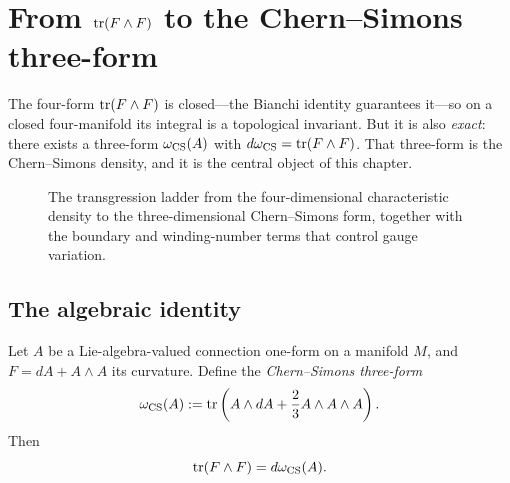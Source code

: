 \section{From $\operatorname{tr}(F\wedge F)$ to the Chern--Simons three-form}\label{sec:CS-form}

The four-form $\operatorname{tr}(F\wedge F)$ is closed---the Bianchi identity guarantees it---so on a closed four-manifold its integral is a topological invariant.  But it is also \emph{exact}: there exists a three-form $\omega_{\operatorname{CS}}(A)$ with $d\omega_{\operatorname{CS}} = \operatorname{tr}(F\wedge F)$.  That three-form is the Chern--Simons density, and it is the central object of this chapter.

\begin{figure}[h]
    \centering
    
    \caption{The transgression ladder from the four-dimensional characteristic density to the three-dimensional Chern--Simons form, together with the boundary and winding-number terms that control gauge variation.}
    \label{fig:transgression-ladder}
\end{figure}

\subsection{The algebraic identity}

\begin{proposition}\label{prop:CS-form}
Let $A$ be a Lie-algebra-valued connection one-form on a manifold $M$, and $F = dA + A\wedge A$ its curvature. Define the \emph{Chern--Simons three-form}
\begin{equation}\label{eq:CS-form-def}
\omega_{\operatorname{CS}}(A) := \operatorname{tr}\left(A\wedge dA + \frac{2}{3}A\wedge A\wedge A\right).
\end{equation}
Then
\begin{equation}\label{eq:F2-equals-dCS}
\operatorname{tr}(F\wedge F) = d\omega_{\operatorname{CS}}(A).
\end{equation}
\end{proposition}

